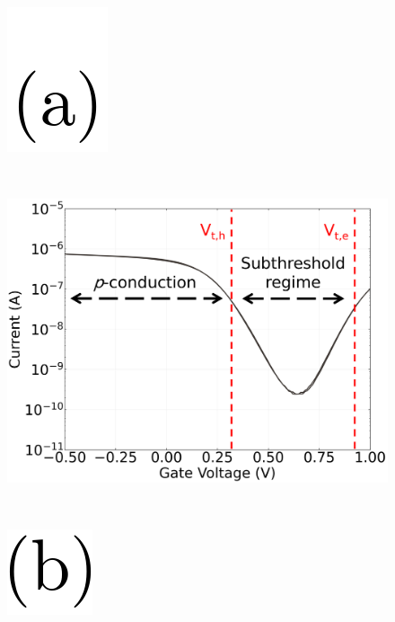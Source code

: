 \documentclass[
  letterpaper,
  DIV=11,
  numbers=noendperiod]{scrartcl}
\begin{document}
\begin{figure}

\begin{minipage}{0.03\linewidth}
\includegraphics{figures/(a).png}\end{minipage}%
%
\begin{minipage}{0.01\linewidth}
~\end{minipage}%
%
\begin{minipage}{0.45\linewidth}
\includegraphics{figures/ch2/CNT_transfer_1.png}\end{minipage}%
%
\begin{minipage}{0.01\linewidth}
~\end{minipage}%
%
\begin{minipage}{0.03\linewidth}
\includegraphics{figures/(b).png}\end{minipage}%
%
\begin{minipage}{0.01\linewidth}

\end{minipage}
\end{figure}
\end{document}
